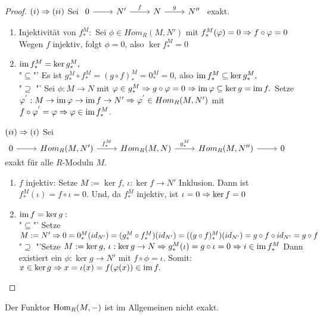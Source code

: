 \begin{proof}
	$(i) \Rightarrow (ii)$ Sei $\begin{tikzcd}
	0  \arrow{r} & N' \arrow{r}{f} & N \arrow{r}{g} & N'' 
	\end{tikzcd} $ exakt. 
	\begin{enumerate}
		\item Injektivität von $f_{*}^{M}: $ Sei $ \phi \in Hom_{R}(M,N')$ mit $f_{*}^{M}(\varphi) = 0 \Rightarrow f \circ \varphi = 0$ Wegen $f$ injektiv, folgt $\phi = 0$, also $ \ker f_{*}^{M} = 0$
		\item $\operatorname{im} f_{*}^{M} = \ker g_{*}^{M},$ \\
		"$\subseteq$"' Es  ist $g_{*}^{M} \circ f_{*}^{M} = (g \circ f)_{*}^{M} = 0_{*}^{M} = 0$, also $\operatorname{im} f_{*}^{M} \subseteq \ker g_{*}^{M},$ \\
		"$\supseteq$ "' 
		Sei $\phi: M \to N $ mit $ \varphi \in  g_{*}^{M} \Rightarrow g \circ \varphi = 0 \Rightarrow \operatorname{im} \varphi  \subseteq \ker g = \operatorname{im} f. $ Setze $\varphi^{'}: M \to \operatorname{im} \varphi \to \operatorname{im} f  \to N' \Rightarrow \varphi^{'} \in Hom_{R}(M,N') $ mit $ f \circ \varphi^{'} = \varphi \Rightarrow \varphi \in \operatorname{im} f_{*}^{M}$.
	\end{enumerate}
	$(ii) \Rightarrow (i)$ Sei $\begin{tikzcd}
	0  \arrow{r} & Hom_{R}(M,N') \arrow{r}{f_{*}^{M}} & Hom_{R}(M,N)  \arrow{r}{g_{*}^{M}} & Hom_{R}(M,N'') \arrow{r} & 0
	\end{tikzcd} $ exakt für alle $R$-Moduln $M$.
	\begin{enumerate}
		\item $f$ injektiv: Setze $M := \ker f , \, \iota: \ker f \to N' $ Inklusion. Dann ist
		 $f_{*}^{M}(\iota)  = f \circ \iota = 0$. Und, da $f_{*}^{M}$ injektiv, ist $ \iota = 0 \Rightarrow \ker f = 0$
		\item $\operatorname{im} f = \ker g: $ \\
		"$\subseteq$"' Setze $M := N' \Rightarrow 0 = 0_{*}^{M}(id_{N'}) = (g_{*}^{M} \circ f_{*}^{M}) (id_{N'}) = ((g \circ f)_{*}^{M})(id_{N'}) = g \circ f \circ id_{N'} = g \circ f $ \\
		"$\supseteq$ "'Setze $M := \ker g , \, \iota: \ker g \to N \Rightarrow g_{*}^{M} (\iota) = g \circ \iota = 0 \Rightarrow i \in \operatorname{im} f_{*}^{M}$ Dann existiert ein $\phi: \ker g \to N' $ mit $ f \circ \phi = \iota. $ Somit: $ x \in \ker g \Rightarrow x = \iota(x) = f(\varphi(x)) \in \operatorname{im} f.$
	\end{enumerate}
\end{proof}
\begin{anm}
	Der Funktor $\operatorname{Hom}_R(M,-) $ ist im Allgemeinen nicht exakt.
\end{anm}
